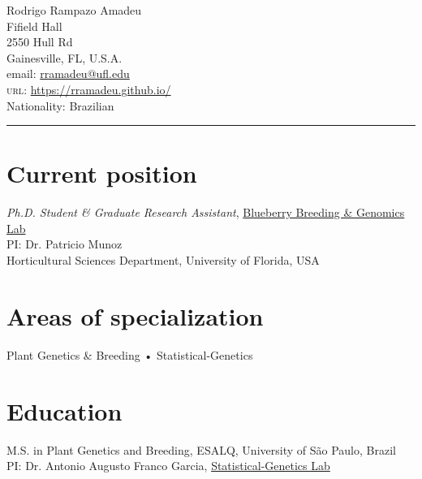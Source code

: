 \documentclass[10pt, a4paper]{article}
\newcommand{\years}[1]{\marginnote{\scriptsize #1}}
\begin{document}
{\LARGE Rodrigo Rampazo Amadeu}\\[1cm]
 Fifield Hall\\
 2550  Hull Rd\\
Gainesville, FL, U.S.A.\\[.2cm]
email: \href{mailto:rramadeu@ufl.edu}{rramadeu@ufl.edu}\\
\textsc{url}: \href{https://rramadeu.github.io/}{https://rramadeu.github.io/}\\ 
Nationality:  Brazilian\\
\hrule
\section*{Current position}
\emph{Ph.D. Student \& Graduate Research Assistant}, \href{https://www.blueberrybreeding.com}{Blueberry Breeding \& Genomics Lab}\\
PI: Dr. Patricio Munoz\\
Horticultural Sciences Department, University of Florida, USA

\section*{Areas of specialization}
 Plant Genetics \& Breeding • Statistical-Genetics


\section*{Education}
\noindent
\years{2018}\textsc{M.S.} in Plant Genetics and Breeding, ESALQ, University of São Paulo, Brazil\\
PI: Dr. Antonio Augusto Franco Garcia, \href{http://statgen.esalq.usp.br}{Statistical-Genetics Lab} \vspace{0.05in}
\end{document}
